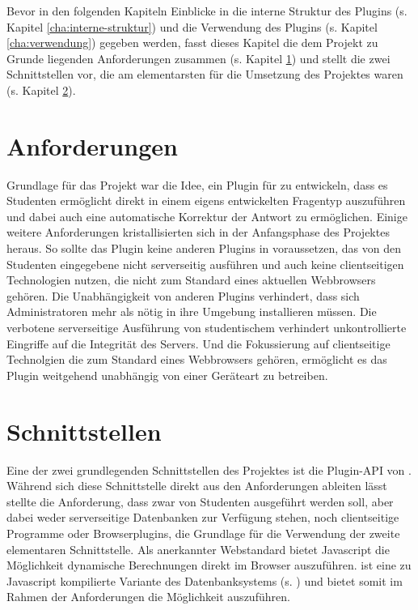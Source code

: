 Bevor in den folgenden Kapiteln Einblicke in die interne Struktur des Plugins (s. Kapitel \ref{cha:interne-struktur}) und die Verwendung des Plugins (s. Kapitel \ref{cha:verwendung}) gegeben werden, fasst dieses Kapitel die dem Projekt zu Grunde liegenden Anforderungen zusammen (s. Kapitel \ref{sec:anforderungen}) und stellt die zwei Schnittstellen vor, die am elementarsten für die Umsetzung des Projektes waren (s. Kapitel \ref{sec:schnittstellen}).

\section{Anforderungen}
\label{sec:anforderungen}

Grundlage für das  Projekt war die Idee, ein Plugin für  zu entwickeln, dass es Studenten ermöglicht  direkt in einem eigens entwickelten Fragentyp auszuführen und dabei auch eine automatische Korrektur der Antwort zu ermöglichen. Einige weitere Anforderungen kristallisierten sich in der Anfangsphase des Projektes heraus. So sollte das Plugin keine anderen Plugins in  voraussetzen, das von den Studenten eingegebene  nicht serverseitig ausführen und auch keine clientseitigen Technologien nutzen, die nicht zum Standard eines aktuellen Webbrowsers gehören. Die Unabhängigkeit von anderen Plugins verhindert, dass sich Administratoren mehr als nötig in ihre  Umgebung installieren müssen. Die verbotene serverseitige Ausführung von studentischem  verhindert unkontrollierte Eingriffe auf die Integrität des Servers. Und die Fokussierung auf clientseitige Technolgien die zum Standard eines Webbrowsers gehören, ermöglicht es das Plugin weitgehend unabhängig von einer Geräteart zu betreiben.

\section{Schnittstellen}
\label{sec:schnittstellen}

Eine der zwei grundlegenden Schnittstellen des  Projektes ist die Plugin-API von . Während sich diese Schnittstelle direkt aus den Anforderungen ableiten lässt stellte die Anforderung, dass  zwar von Studenten ausgeführt werden soll, aber dabei weder serverseitige Datenbanken zur Verfügung stehen, noch clientseitige Programme oder Browserplugins, die Grundlage für die Verwendung der zweite elementaren Schnittstelle. Als anerkannter Webstandard bietet Javascript die Möglichkeit dynamische Berechnungen direkt im Browser auszuführen.  ist eine zu Javascript kompilierte Variante des Datenbanksystems  (s. \cite{SQLjs}) und bietet somit im Rahmen der Anforderungen die Möglichkeit  auszuführen.

